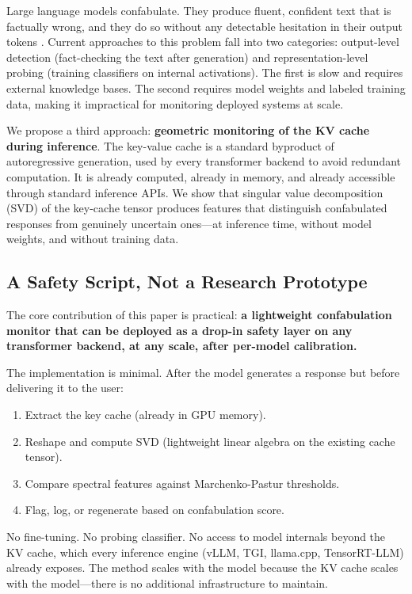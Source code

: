 Large language models confabulate. They produce fluent, confident text that
is factually wrong, and they do so without any detectable hesitation in
their output tokens \citep{ji2023survey}. Current approaches to this problem
fall into two categories: output-level detection (fact-checking the text
after generation) and representation-level probing (training classifiers on
internal activations). The first is slow and requires external knowledge
bases. The second requires model weights and labeled training data, making
it impractical for monitoring deployed systems at scale.

We propose a third approach: \textbf{geometric monitoring of the KV cache
during inference}. The key-value cache is a standard byproduct of
autoregressive generation, used by every transformer backend to avoid
redundant computation. It is already computed, already in memory, and
already accessible through standard inference APIs. We show that singular
value decomposition (SVD) of the key-cache tensor produces features that
distinguish confabulated responses from genuinely uncertain
ones---at inference time, without model weights, and without training
data.

\subsection{A Safety Script, Not a Research Prototype}

The core contribution of this paper is practical: \textbf{a lightweight
confabulation monitor that can be deployed as a drop-in safety layer on
any transformer backend, at any scale, after per-model calibration.}

The implementation is minimal. After the model generates a response but
before delivering it to the user:

\begin{enumerate}[nosep]
  \item Extract the key cache (already in GPU memory).
  \item Reshape and compute SVD (lightweight linear algebra on the
    existing cache tensor).
  \item Compare spectral features against Marchenko-Pastur thresholds.
  \item Flag, log, or regenerate based on confabulation score.
\end{enumerate}

No fine-tuning. No probing classifier. No access to model internals
beyond the KV cache, which every inference engine (vLLM, TGI,
llama.cpp, TensorRT-LLM) already exposes. The method scales with the
model because the KV cache scales with the model---there is no
additional infrastructure to maintain.

